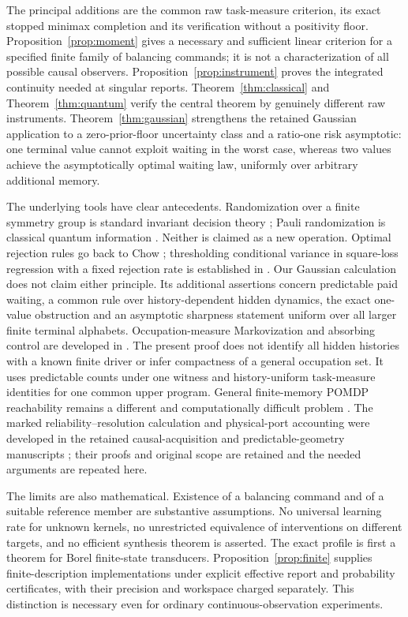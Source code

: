 The principal additions are the common raw task-measure criterion, its exact stopped minimax completion and its verification without a positivity floor. Proposition~\ref{prop:moment} gives a necessary and sufficient linear criterion for a specified finite family of balancing commands; it is not a characterization of all possible causal observers. Proposition~\ref{prop:instrument} proves the integrated continuity needed at singular reports. Theorem~\ref{thm:classical} and Theorem~\ref{thm:quantum} verify the central theorem by genuinely different raw instruments. Theorem~\ref{thm:gaussian} strengthens the retained Gaussian application \cite{GTF52} to a zero-prior-floor uncertainty class and a ratio-one risk asymptotic: one terminal value cannot exploit waiting in the worst case, whereas two values achieve the asymptotically optimal waiting law, uniformly over arbitrary additional memory.

The underlying tools have clear antecedents. Randomization over a finite symmetry group is standard invariant decision theory \cite{Luschgy}; Pauli randomization is classical quantum information \cite{AMTW}. Neither is claimed as a new operation. Optimal rejection rules go back to Chow \cite{Chow}; thresholding conditional variance in square-loss regression with a fixed rejection rate is established in \cite{DHZ}. Our Gaussian calculation does not claim either principle. Its additional assertions concern predictable paid waiting, a common rule over history-dependent hidden dynamics, the exact one-value obstruction and an asymptotic sharpness statement uniform over all larger finite terminal alphabets. Occupation-measure Markovization and absorbing control are developed in \cite{PZExtreme,PZContinuity,DPAbsorb,DPChatter}. The present proof does not identify all hidden histories with a known finite driver or infer compactness of a general occupation set. It uses predictable counts under one witness and history-uniform task-measure identities for one common upper program. General finite-memory POMDP reachability remains a different and computationally difficult problem \cite{CCGK,ACSS}. The marked reliability--resolution calculation and physical-port accounting were developed in the retained causal-acquisition and predictable-geometry manuscripts \cite{GTF52,GTF54}; their proofs and original scope are retained and the needed arguments are repeated here.

The limits are also mathematical. Existence of a balancing command and of a suitable reference member are substantive assumptions. No universal learning rate for unknown kernels, no unrestricted equivalence of interventions on different targets, and no efficient synthesis theorem is asserted. The exact profile is first a theorem for Borel finite-state transducers. Proposition~\ref{prop:finite} supplies finite-description implementations under explicit effective report and probability certificates, with their precision and workspace charged separately. This distinction is necessary even for ordinary continuous-observation experiments.
